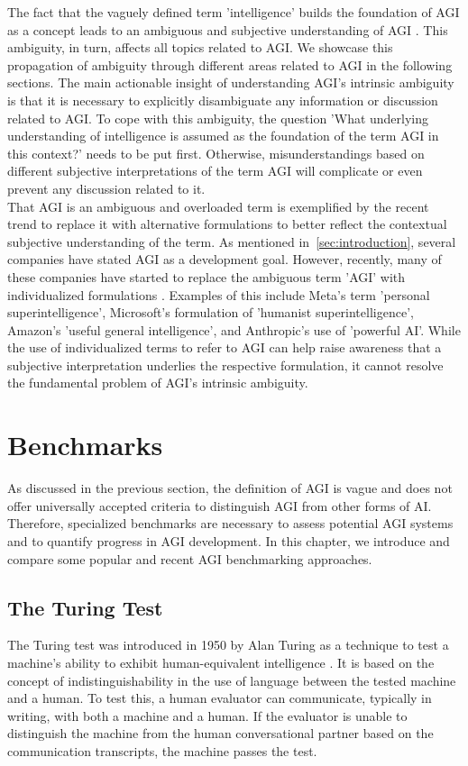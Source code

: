 The fact that the vaguely defined term 'intelligence' builds the foundation of AGI as a concept leads to an ambiguous and subjective understanding of AGI \citep{hendrycks_definition_2025}.
This ambiguity, in turn, affects all topics related to AGI.
We showcase this propagation of ambiguity through different areas related to AGI in the following sections.
The main actionable insight of understanding AGI's intrinsic ambiguity is that it is necessary to explicitly disambiguate any information or discussion related to AGI.
To cope with this ambiguity, the question 'What underlying understanding of intelligence is assumed as the foundation of the term AGI in this context?' needs to be put first.
Otherwise, misunderstandings based on different subjective interpretations of the term AGI will complicate or even prevent any discussion related to it.\\

That AGI is an ambiguous and overloaded term is exemplified by the recent trend to replace it with alternative formulations to better reflect the contextual subjective understanding of the term.
As mentioned in~\cref{sec:introduction}, several companies have stated AGI as a development goal.
However, recently, many of these companies have started to replace the ambiguous term 'AGI' with individualized formulations \citep{field_ai_2025}.
Examples of this include Meta's term 'personal superintelligence', Microsoft's formulation of 'humanist superintelligence', Amazon's 'useful general intelligence', and Anthropic's use of 'powerful AI'.
While the use of individualized terms to refer to AGI can help raise awareness that a subjective interpretation underlies the respective formulation, it cannot resolve the fundamental problem of AGI's intrinsic ambiguity.

\section{Benchmarks}\label{sec:benchmarks}
As discussed in the previous section, the definition of AGI is vague and does not offer universally accepted criteria to distinguish AGI from other forms of AI.
Therefore, specialized benchmarks are necessary to assess potential AGI systems and to quantify progress in AGI development.
In this chapter, we introduce and compare some popular and recent AGI benchmarking approaches.

\subsection{The Turing Test}
The Turing test was introduced in 1950 by Alan Turing as a technique to test a machine's ability to exhibit human-equivalent intelligence \citep{turing_icomputing_1950}.
It is based on the concept of indistinguishability in the use of language between the tested machine and a human.
To test this, a human evaluator can communicate, typically in writing, with both a machine and a human.
If the evaluator is unable to distinguish the machine from the human conversational partner based on the communication transcripts, the machine passes the test.\\


